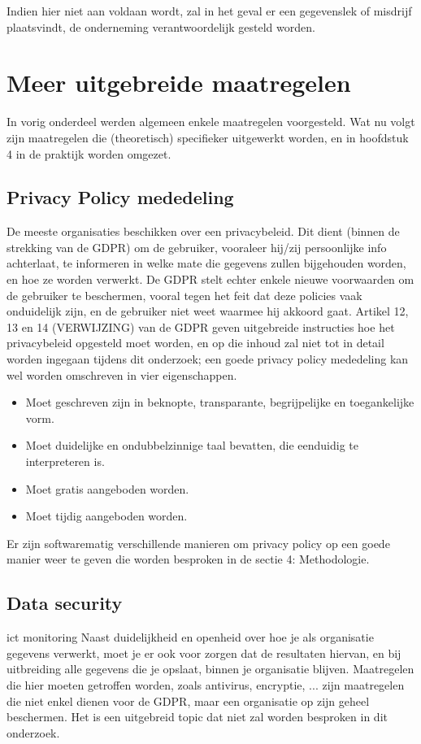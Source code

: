 Indien hier niet aan voldaan wordt, zal in het geval er een gegevenslek of misdrijf plaatsvindt, de onderneming verantwoordelijk gesteld worden. 

\section{Meer uitgebreide maatregelen}
In vorig onderdeel werden algemeen enkele maatregelen voorgesteld. Wat nu volgt zijn maatregelen die (theoretisch) specifieker uitgewerkt worden, en in hoofdstuk 4 in de praktijk worden omgezet. 

\subsection{Privacy Policy mededeling}
De meeste organisaties beschikken over een privacybeleid. Dit dient (binnen de strekking van de GDPR) om de gebruiker, vooraleer hij/zij persoonlijke info achterlaat, te informeren in welke mate die gegevens zullen bijgehouden worden, en hoe ze worden verwerkt. De GDPR stelt echter enkele nieuwe voorwaarden om de gebruiker te beschermen, vooral tegen het feit dat deze policies vaak onduidelijk zijn, en de gebruiker niet weet waarmee hij akkoord gaat.
Artikel 12, 13 en 14 (VERWIJZING) van de GDPR geven uitgebreide instructies hoe het privacybeleid opgesteld moet worden, en op die inhoud zal niet tot in detail worden ingegaan tijdens dit onderzoek; een goede privacy policy mededeling kan wel worden omschreven in vier eigenschappen. 

\begin{itemize}
	\item Moet geschreven zijn in beknopte, transparante, begrijpelijke en toegankelijke vorm.
	\item Moet duidelijke en ondubbelzinnige taal bevatten, die eenduidig te interpreteren is. 
	\item Moet gratis aangeboden worden.
	\item Moet tijdig aangeboden worden.
\end{itemize}

Er zijn softwarematig verschillende manieren om privacy policy op een goede manier weer te geven die worden besproken in de sectie 4: Methodologie. 

\subsection{Data security}
ict monitoring 
Naast duidelijkheid en openheid over hoe je als organisatie gegevens verwerkt, moet je er ook voor zorgen dat de resultaten hiervan, en bij uitbreiding alle gegevens die je opslaat, binnen je organisatie blijven.
Maatregelen die hier moeten getroffen worden, zoals antivirus, encryptie, ... zijn maatregelen die niet enkel dienen voor de GDPR, maar een organisatie op zijn geheel beschermen. 
Het is een uitgebreid topic dat niet zal worden besproken in dit onderzoek. 


